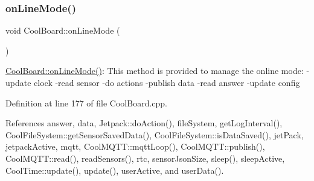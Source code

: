 \subsubsection{\texorpdfstring{on\+Line\+Mode()}{onLineMode()}}
{\footnotesize\ttfamily void Cool\+Board\+::on\+Line\+Mode (\begin{DoxyParamCaption}{ }\end{DoxyParamCaption})}

\hyperlink{classCoolBoard_aa0bbc4bc605e35618d18e68795c61363}{Cool\+Board\+::on\+Line\+Mode()}\+: This method is provided to manage the online mode\+: -\/update clock -\/read sensor -\/do actions -\/publish data -\/read answer -\/update config 

Definition at line 177 of file Cool\+Board.\+cpp.



References answer, data, Jetpack\+::do\+Action(), file\+System, get\+Log\+Interval(), Cool\+File\+System\+::get\+Sensor\+Saved\+Data(), Cool\+File\+System\+::is\+Data\+Saved(), jet\+Pack, jetpack\+Active, mqtt, Cool\+M\+Q\+T\+T\+::mqtt\+Loop(), Cool\+M\+Q\+T\+T\+::publish(), Cool\+M\+Q\+T\+T\+::read(), read\+Sensors(), rtc, sensor\+Json\+Size, sleep(), sleep\+Active, Cool\+Time\+::update(), update(), user\+Active, and user\+Data().


